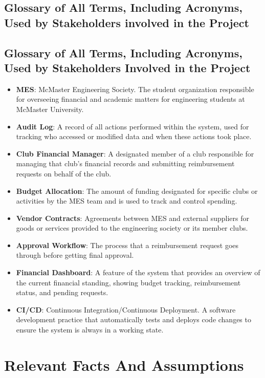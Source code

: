 \documentclass[12pt]{article}
\begin{document}
\subsection{Glossary of All Terms, Including Acronyms, Used by Stakeholders
involved in the Project}

\subsection{Glossary of All Terms, Including Acronyms, Used by Stakeholders Involved in the Project}

\begin{itemize}
    \item \textbf{MES}: McMaster Engineering Society. The student organization responsible for overseeing financial and academic matters for engineering students at McMaster University.    
    \item \textbf{Audit Log}: A record of all actions performed within the system, used for tracking who accessed or modified data and when these actions took place.
    \item \textbf{Club Financial Manager}: A designated member of a club responsible for managing that club's financial records and submitting reimbursement requests on behalf of the club.
    \item \textbf{Budget Allocation}: The amount of funding designated for specific clubs or activities by the MES team and is used to track and control spending.
    \item \textbf{Vendor Contracts}: Agreements between MES and external suppliers for goods or services provided to the engineering society or its member clubs.
    \item \textbf{Approval Workflow}: The process that a reimbursement request goes through before getting final approval.
    \item \textbf{Financial Dashboard}: A feature of the system that provides an overview of the current financial standing, showing budget tracking, reimbursement status, and pending requests.
    \item \textbf{CI/CD}: Continuous Integration/Continuous Deployment. A software development practice that automatically tests and deploys code changes to ensure the system is always in a working state.
\end{itemize}


\section{Relevant Facts And Assumptions}
\end{document}
